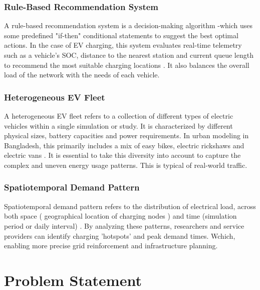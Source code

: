 \documentclass{thesis-library}
\begin{document}
\subsubsection{Rule-Based Recommendation System}
A rule-based recommendation system is a decision-making algorithm -which uses some predefined "if-then" conditional statements to suggest the best optimal actions. In the case of EV charging, this system evaluates real-time telemetry such as a vehicle's SOC, distance to the nearest station and current queue length to recommend the most suitable charging locations \cite{hua2014adaptive}. It also balances the overall load of the network with the needs of each vehicle.

\subsubsection{Heterogeneous EV Fleet}
A heterogeneous EV fleet refers to a collection of different types of electric vehicles within a single simulation or study. It is characterized by different physical sizes, battery capacities and power requirements. In urban modeling in Bangladesh, this primarily includes a mix of easy bikes, electric rickshaws and electric vans \cite{doley2024sustainability}. It is essential to take this diversity into account to capture the complex and uneven energy usage patterns. This is typical of real-world traffic.

\subsubsection{Spatiotemporal Demand Pattern}
Spatiotemporal demand pattern refers to the distribution of electrical load, across both space ( geographical location of charging nodes ) and time (simulation period or daily interval) \cite{parking_area_ev2022}. By analyzing these patterns, researchers and service providers can identify charging 'hotspots' and peak demand times. Wchich, enabling more precise grid reinforcement and infrastructure planning.

\section{Problem Statement}
\end{document}

